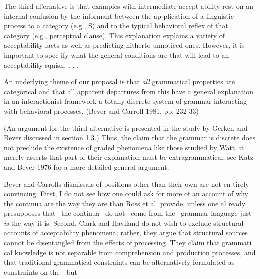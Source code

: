 \begin{styleStandard}
The third al!ernative is that examples with intermediate accept\- ability rest on an internal confusion by the informant between the ap\- plication of a linguistic process to a category (e.g., {\textquotedbl}S{\textquotedbl}) and to the typical behavioral reflex of that category (e.g., {\textquotedbl}perceptual clause{\textquotedbl}). This explanation explains a variety of acceptability facts as well as predicting hitherto unnoticed ones. However, it is important to spec\- ify what the general conditions are that will lead to an acceptability squish. . . .
\end{styleStandard}


\begin{styleStandard}
An underlying theme of our proposal is that \textit{all}\textit{ }grammatical properties are categorical and that all apparent departures from this have a general explanation in an interactionist framework-a totally discrete system of grammar interacting with behavioral processes. (Bever and Carroll 1981, pp. 232-33)
\end{styleStandard}


\begin{styleStandard}
(An argument for the third alternative is presented in the study by Gerken and Bever discussed in section 1.3.) Thus, the claim that the grammar is discrete does not preclude the existence of graded phenomena like those studied by Watt, it merely asserts that part of their explanation must be extragrammatical; see Katz and Bever 1976 for a more detailed general argument.
\end{styleStandard}


\begin{styleStandard}
Bever and Carroll{\textquotesingle}s dismissals of positions other than their own are not en\- tirely convincing. First, I do not see how one could ask for more of an account of {\textquotedbl}why the continua are the way they are{\textquotedbl} than Ross et al. provide, unless one al\- ready presupposes that \ the continua \ do not \ come from the \ grammar-language just \textit{is}\textit{ }the way it is. Second, Clark and Haviland do not wish to exclude structural accounts of acceptability phenomena; rather, they argue that structural sources cannot be disentangled from the effects of processing. They claim that grammati\- cal knowledge is not separable from comprehension and production processes, and that traditional grammatical constraints can be alternatively formulated as cunstrnints on the\ \ but
\end{styleStandard}



